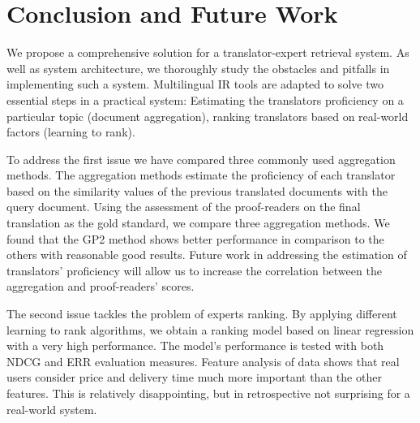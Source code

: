 \vspace{-0.2cm}
\section{Conclusion and Future Work}
\vspace{-0.2cm}
\label{sec:conclusion}
We propose a comprehensive solution for a translator-expert retrieval system. As well as system architecture, we thoroughly study the obstacles and pitfalls in implementing such a system. Multilingual IR tools are adapted to solve two essential steps in a practical system: Estimating the translators proficiency on a particular topic (document aggregation), ranking translators based on real-world factors (learning to rank).  %

To address the first issue we have compared three commonly used aggregation methods. The aggregation methods estimate the proficiency of each translator based on the similarity values of the previous translated documents with the query document. Using the assessment of the proof-readers on the final translation as the gold standard, we compare three aggregation methods. We found that the GP2 method shows better performance in comparison to the others with reasonable good results. Future work in addressing the estimation of translators' proficiency will allow us to increase the correlation between the aggregation and proof-readers' scores.

The second issue tackles the problem of experts ranking. By applying different learning to rank algorithms, we obtain a ranking model based on linear regression with a very high performance. The model's performance is tested with both NDCG and ERR evaluation measures. Feature analysis of data shows that real users consider  price and delivery time much more important than the other features. This is relatively disappointing, but in retrospective not surprising for a real-world system.

